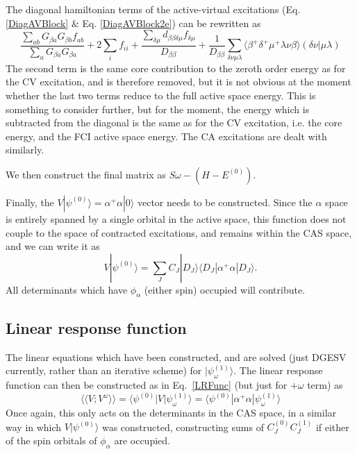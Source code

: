 \documentclass[a4paper,oneside,11pt]{article}
\numberwithin{equation}{section}
\begin{document}
The diagonal hamiltonian terms of the active-virtual excitations (Eq. \ref{DiagAVBlock} \& Eq. \ref{DiagAVBlock2e}) can be rewritten as
\begin{equation}
\frac{\sum_{ab} G_{\beta a} G_{\beta b} f_{ab}}{\sum_a G_{\beta a} G_{\beta a}} + 2 \sum_i f_{ii} + \frac{\sum_{\delta \mu} d_{\beta \beta \delta \mu} f_{\delta \mu}}{D_{\beta \beta}} + \frac{1}{D_{\beta \beta}} \sum_{\delta \nu \mu \lambda} \langle \beta^{+} \delta^{+} \mu^{+} \lambda \nu \beta \rangle (\delta \nu | \mu \lambda)
\end{equation}
The second term is the same core contribution to the zeroth order energy as for the CV excitation, and is therefore removed, but it is not obvious at the moment whether the last two terms reduce to 
the full active space energy. This is something to consider further, but for the moment, the energy which is subtracted from the diagonal is the same as for the CV excitation, i.e. the core energy, and the 
FCI active space energy. The CA excitations are dealt with similarly.

We then construct the final matrix as $S\omega - (H-E^{(0)})$.

Finally, the $V|\psi^{(0)} \rangle = \alpha^{+} \alpha |0 \rangle$ vector needs to be constructed. 
Since the $\alpha$ space is entirely spanned by a single orbital in the active space, this function does not couple
to the space of contracted excitations, and remains within the CAS space, and we can write it as
\begin{equation}
V|\psi^{(0)} \rangle = \sum_J C_J |D_J \rangle \langle D_J | \alpha^{+} \alpha | D_J \rangle    .
\end{equation}
All determinants which have $\phi_{\alpha}$ (either spin) occupied will contribute.

\subsection{Linear response function}
The linear equations which have been constructed, and are solved (just DGESV currently, rather than an iterative scheme) for $|\psi^{(1)}_{\omega} \rangle$. The linear response function can then be
constructed as in Eq.~\ref{LRFunc} (but just for $+\omega$ term) as
\begin{equation}
\langle \langle V ; V^{\omega} \rangle \rangle = \langle \psi^{(0)} | V | \psi^{(1)}_{\omega} \rangle = \langle \psi^{(0)} | \alpha^{+} \alpha | \psi^{(1)}_{\omega} \rangle
\end{equation}
Once again, this only acts on the determinants in the CAS space, in a similar way in which $V|\psi^{(0)} \rangle$ was constructed, constructing sums of $C^{(0)}_J C^{(1)}_J$ if either of the spin orbitals
of $\phi_{\alpha}$ are occupied.
\end{document}
